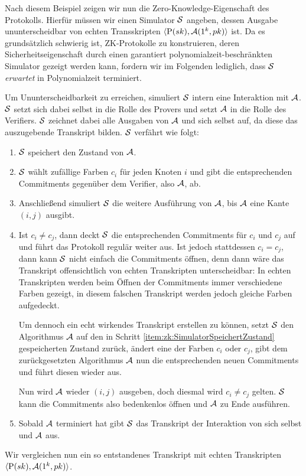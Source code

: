 Nach diesem Beispiel zeigen wir nun die Zero-Knowledge-Eigenschaft des
Protokolls.  Hierfür müssen wir einen Simulator $\mathcal{S}$ angeben, dessen
Ausgabe ununterscheidbar von echten Transskripten $\langle
\mathrm{P}(sk), \mathcal{A}(1^k, pk) \rangle$ ist.  Da es grundsätzlich
schwierig ist, ZK-Protokolle zu konstruieren, deren
Sicherheitseigenschaft durch einen garantiert
poly\-nomialzeit-be\-schränk\-ten Simulator gezeigt werden kann, fordern
wir im Folgenden lediglich, dass $\mathcal{S}$ \textit{erwartet} in Polynomialzeit
terminiert.

Um Ununterscheidbarkeit zu erreichen, simuliert $\mathcal{S}$ intern eine
Interaktion mit $\mathcal{A}$. $\mathcal{S}$ setzt sich dabei selbst in die Rolle des
Provers und setzt $\mathcal{A}$ in die Rolle des Verifiers. $\mathcal{S}$ zeichnet dabei
alle Ausgaben von $\mathcal{A}$ und sich selbst auf, da diese das auszugebende
Transkript bilden.  $\mathcal{S}$ verfährt wie folgt:
\begin{enumerate}
\item \label{item:zk:SimulatorSpeichertZustand}
  $\mathcal{S}$ speichert den Zustand von $\mathcal{A}$.
\item $\mathcal{S}$ wählt zufällige Farben $c_i$ für jeden Knoten $i$ und gibt
  die entsprechenden Commitments gegenüber dem Verifier, also $\mathcal{A}$, ab. 
\item Anschließend simuliert $\mathcal{S}$ die weitere Ausführung von $\mathcal{A}$, bis
  $\mathcal{A}$ eine Kante $(i,j)$ ausgibt.
\item Ist $c_i \neq c_j$, dann deckt $\mathcal{S}$ die entsprechenden
  Commitments für $c_i$ und $c_j$ auf und führt das Protokoll regulär
  weiter aus. Ist jedoch stattdessen $c_i = c_j$, dann kann $\mathcal{S}$ nicht
  einfach die Commitments öffnen, denn dann wäre das Transkript
  offensichtlich von echten Transkripten unterscheidbar: In echten
  Transkripten werden beim Öffnen der Commitments immer verschiedene
  Farben gezeigt, in diesem falschen Transkript werden jedoch gleiche
  Farben aufgedeckt. 
  
  Um dennoch ein echt wirkendes Transkript erstellen zu können, setzt
  $\mathcal{S}$ den Algorithmus $\mathcal{A}$ auf den in Schritt
  \ref{item:zk:SimulatorSpeichertZustand} gespeicherten Zustand zurück,
  ändert eine der Farben $c_i$ oder $c_j$, gibt dem zurückgesetzten
  Algorithmus $\mathcal{A}$ nun die entsprechenden neuen Commitments und führt
  diesen wieder aus.
  
  Nun wird $\mathcal{A}$ wieder $(i,j)$ ausgeben, doch diesmal wird $c_i \neq
  c_j$ gelten. $\mathcal{S}$ kann die Commitments also bedenkenlos öffnen und
  $\mathcal{A}$ zu Ende ausführen.

\item Sobald $\mathcal{A}$ terminiert hat gibt $\mathcal{S}$ das Transkript der
  Interaktion von sich selbst und $\mathcal{A}$ aus. 
\end{enumerate}
Wir vergleichen nun ein so entstandenes Transkript mit echten
Transkripten $\langle \mathrm{P}(sk), \mathcal{A}(1^k, pk) \rangle$.

